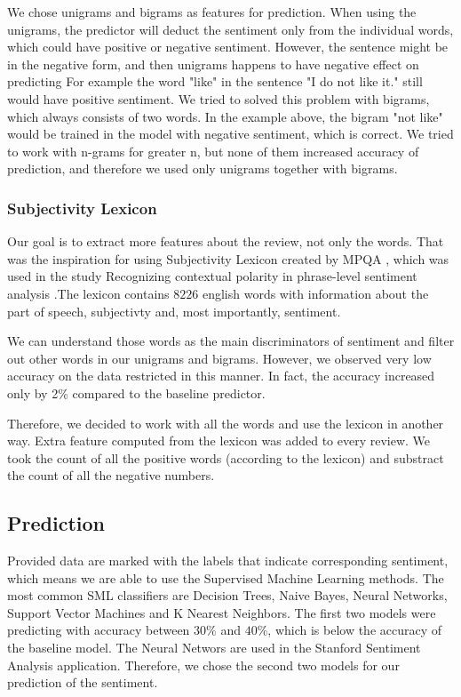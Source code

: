 \documentclass{sig-alternate}
\begin{document}
We chose unigrams and bigrams as features for prediction.
When using the unigrams, the predictor will deduct the sentiment only from the individual words, which could have positive or negative sentiment.
However, the sentence might be in the negative form, and then unigrams happens to have negative effect on predicting
For example the word "like" in the sentence "I do not like it." still would have positive sentiment.
We tried to solved this problem with bigrams, which always consists of two words.
In the example above, the bigram "not like" would be trained in the model with negative sentiment, which is correct.
We tried to work with n-grams for greater n, but none of them increased accuracy of prediction, and therefore we used only unigrams together with bigrams.

\subsubsection{Subjectivity Lexicon}
Our goal is to extract more features about the review, not only the words.
That was the inspiration for using Subjectivity Lexicon created by MPQA \cite{mpqa}, which was used in the study Recognizing contextual polarity in phrase-level sentiment analysis \cite{lex}.The lexicon contains $8226$ english words with information about the part of speech, subjectivty and, most importantly, sentiment.

We can understand those words as the main discriminators of sentiment and filter out other words in our unigrams and bigrams.
However, we observed very low accuracy on the data restricted in this manner.
In fact, the accuracy increased only by 2\% compared to the baseline predictor.

Therefore, we decided to work with all the words and use the lexicon in another way.
Extra feature computed from the lexicon was added to every review.
We took the count of all the positive words (according to the lexicon) and substract the count of all the negative numbers.

\subsection{Prediction}
Provided data are marked with the labels that indicate corresponding sentiment, which means we are able to use the Supervised Machine Learning methods.
The most common SML classifiers are Decision Trees, Naive Bayes, Neural Networks, Support Vector Machines and K Nearest Neighbors.
The first two models were predicting with accuracy between $30\%$ and $40\%$, which is below the accuracy of the baseline model.
The Neural Networs are used in the Stanford Sentiment Analysis application.
Therefore, we chose the second two models for our prediction of the sentiment.
\end{document}

